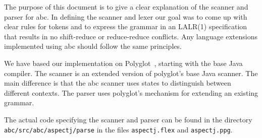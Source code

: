 The purpose of this document is to give a clear explanation of the scanner
and parser for abc.    In defining the scanner and lexer our goal was to
come up with clear rules for tokens and to express the grammar in an
LALR(1) specification that results in no shift-reduce or reduce-reduce
conflicts.   Any language extensions implemented using abc should follow
the same principles.

We have based our implementation on Polyglot~\cite{Nystrom:2003:PEC}, 
starting with the base Java compiler.   The scanner is an extended version
of polyglot's base Java scanner.   The main difference is that the abc
scanner uses states to distinguish between different contexts.  The parser
uses polyglot's mechanism for extending an existing grammar.

The actual code specifying the scanner and parser can be found in the
directory \texttt{abc/src/abc/\-aspectj/parse} in the files \texttt{aspectj.flex}
and \texttt{aspectj.ppg}.
